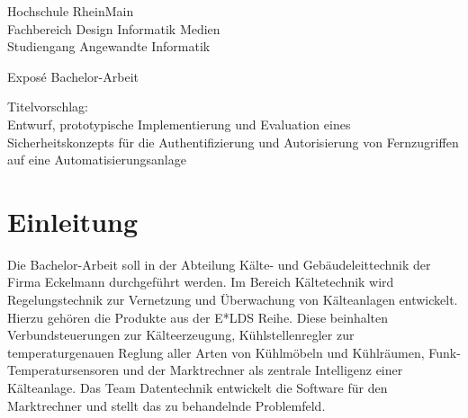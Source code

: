 \documentclass{article}
\newcommand{\blankpage}{
\newpage
\thispagestyle{empty}
\mbox{}
\newpage
}
\begin{document}

\begin{titlepage}
  \setlength{\parindent}{0em}

\begin{minipage}{\textwidth}
    \centering
    \vspace{0.8cm}
    \begin{large}Hochschule RheinMain\\
    Fachbereich Design Informatik Medien\\
    Studiengang Angewandte Informatik\end{large}
\end{minipage}

\begin{minipage}{\textwidth}
    \centering
    \vspace{0.8cm}
   \begin{large} 
Exposé Bachelor-Arbeit\\
	\end{large} 
    \renewcommand{\baselinestretch}{1}
    \small\normalsize
\end{minipage}
\begin{minipage}{\textwidth}
    \centering
    \vspace{0.8cm}
   \begin{large} 
Titelvorschlag:\\
Entwurf, prototypische Implementierung und Evaluation eines Sicherheitskonzepts für die Authentifizierung und Autorisierung von Fernzugriffen auf eine Automatisierungsanlage
	\end{large}    
    \vspace{4cm}
    \renewcommand{\baselinestretch}{1}
    \small\normalsize
\end{minipage}
\end{titlepage}
\clearpage

\blankpage

\tableofcontents
\clearpage

\clearpage	
{}
\pagestyle{plain}

\section{Einleitung}

Die Bachelor-Arbeit soll in der Abteilung Kälte- und Gebäudeleittechnik der Firma Eckelmann durchgeführt werden. Im Bereich Kältetechnik wird Regelungstechnik zur Vernetzung und Überwachung von Kälteanlagen entwickelt. Hierzu gehören die Produkte aus der E*LDS Reihe. Diese beinhalten Verbundsteuerungen zur Kälteerzeugung, Kühlstellenregler zur temperaturgenauen Reglung aller Arten von Kühlmöbeln und Kühlräumen, Funk-Temperatursensoren und der Marktrechner als zentrale Intelligenz einer Kälteanlage. Das Team Datentechnik entwickelt die Software für den Marktrechner und stellt das zu behandelnde Problemfeld. 
\end{document}
